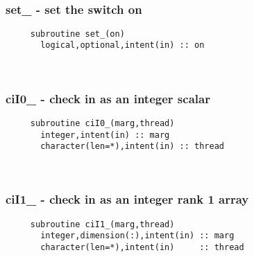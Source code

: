  
\mbox{}\hrulefill\ 
 
  \subsubsection{set\_ - set the switch on}

\begin{verbatim} 
     subroutine set_(on)
       logical,optional,intent(in) :: on
 \end{verbatim}%
 
 
\mbox{}\hrulefill\ 
 
  \subsubsection{ciI0\_ - check in as an integer scalar}

\begin{verbatim} 
     subroutine ciI0_(marg,thread)
       integer,intent(in) :: marg
       character(len=*),intent(in) :: thread
 \end{verbatim}%
 
 
\mbox{}\hrulefill\ 
 
  \subsubsection{ciI1\_ - check in as an integer rank 1 array}

\begin{verbatim} 
     subroutine ciI1_(marg,thread)
       integer,dimension(:),intent(in) :: marg
       character(len=*),intent(in)     :: thread
 \end{verbatim}%
 
